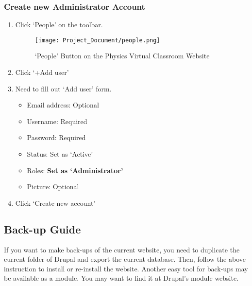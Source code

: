 \documentclass[10pt]{article}
\begin{document}
        \subsubsection{Create new Administrator Account}
            \begin{enumerate}
                \item Click `People’ on the toolbar.
                    \begin{figure}[!ht]
            	        \centering
                        \texttt{[image: Project\_Document/people.png]}
                        \caption{`People' Button on the Physics Virtual Classroom Website}
                    \end{figure}
                \item Click `+Add user'
                \item Need to fill out `Add user' form. 
                    \begin{itemize}
                        \item Email address: Optional
                        \item Username: Required
                        \item Password: Required
                        \item Status: Set as  `Active’
                        \item Roles: \textbf{Set as `Administrator'}
                        \item Picture: Optional
                    \end{itemize}
                \item Click `Create new account’	
            \end{enumerate}
            
    \subsection{Back-up Guide}        
        If you want to make back-ups of the current website, you need to duplicate the current folder of Drupal and export the current database. Then, follow the above instruction to install or re-install the website. Another easy tool for back-ups may be available as a module. You may want to find it at Drupal's module website.
    
\end{document}

